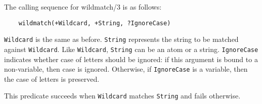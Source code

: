 The calling sequence for wildmatch/3 is as follows:
\begin{verbatim}
    wildmatch(+Wildcard, +String, ?IgnoreCase)  
\end{verbatim}
{\tt Wildcard} is the same as before. {\tt String} represents the string to
be matched against {\tt Wildcard}. Like {\tt Wildcard}, {\tt String} can be
an atom or a string. {\tt IgnoreCase} indicates whether case of letters
should be ignored: if this argument is bound to a non-variable, then case
is ignored. Otherwise, if {\tt IgnoreCase} is a variable, then the case of
letters is preserved.

This predicate succeeds when {\tt Wildcard} matches {\tt String} and fails
otherwise.




